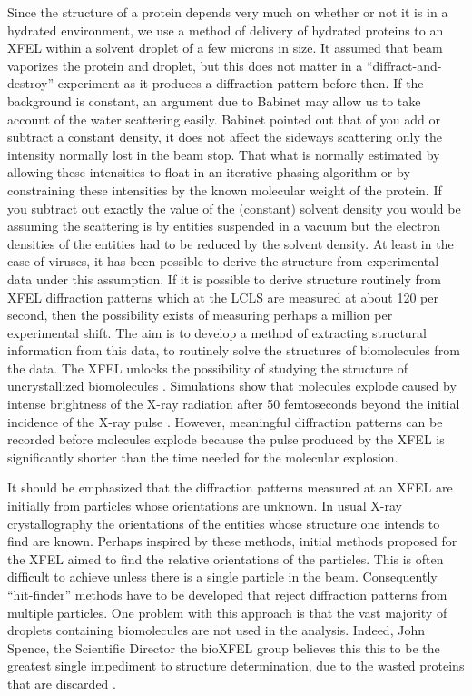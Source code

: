 Since the structure of a protein depends very much on whether or not it is in a hydrated environment, we use a method of delivery of hydrated proteins to an XFEL within a solvent droplet of a few microns in size. It assumed that beam vaporizes the protein and droplet, but this does not matter in a “diffract-and-destroy” experiment \cite{Neutze} as it produces a diffraction pattern before then. If the background is constant, an argument due to Babinet \cite{babinet} may allow us to take account of the water scattering easily. Babinet  pointed out that of you add or subtract a constant density, it does not affect the sideways scattering only the intensity normally lost in the beam stop. That what is normally estimated by allowing these intensities to float in an iterative phasing algorithm or by constraining these intensities by the known molecular weight of the protein. If you subtract out exactly the value of the (constant) solvent density you would be assuming the scattering is by entities suspended in a vacuum but the electron densities of the entities had to be reduced by the solvent density. At least in the case of viruses, it has been possible to derive the structure from experimental data under this assumption. If it is possible to derive structure routinely from XFEL diffraction patterns which at the LCLS are measured at about 120 per second, then the possibility exists of measuring perhaps a million per experimental shift. The aim is to develop a method of extracting structural information from this data, to routinely solve the structures of biomolecules from the data. The XFEL unlocks the possibility of studying the structure of uncrystallized biomolecules \cite{Neutze}. Simulations show that molecules explode caused by intense brightness of the X-ray radiation after 50 femtoseconds beyond the initial incidence of the X-ray pulse \cite{Neutze}. However, meaningful diffraction patterns can be recorded before molecules explode because the pulse produced by the XFEL is significantly shorter than the time needed for the molecular explosion.

It should be emphasized that the diffraction patterns measured at an XFEL are initially from particles whose orientations are unknown. In usual X-ray crystallography the orientations of the entities whose structure one intends to find are known. Perhaps inspired by these methods, initial methods proposed for the XFEL aimed to find the relative orientations of the particles. This is often difficult to achieve unless there is a single particle in the beam. Consequently “hit-finder” methods \cite{cheetah} have to be developed that reject diffraction patterns from multiple particles. One problem with this approach is that the vast majority of droplets containing biomolecules are not used in the analysis. Indeed, John Spence, the Scientific Director the bioXFEL group believes this this to be the greatest single impediment to structure determination, due to the wasted proteins that are discarded \cite{spenceP}.

